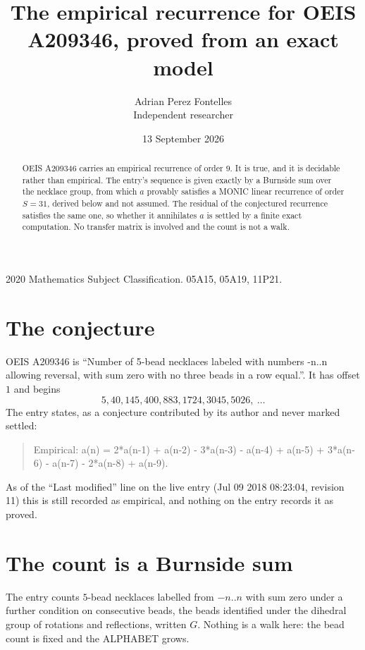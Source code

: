 \documentclass[11pt,a4paper]{article}
\title{The empirical recurrence for OEIS A209346, proved from an exact model}
\author{Adrian Perez Fontelles\\ \small Independent researcher}
\date{13 September 2026}
\theoremstyle{plain}
\theoremstyle{definition}
\begin{document}
\maketitle

\begin{abstract}
OEIS A209346 carries an empirical recurrence of order $9$. It is true, and it is
decidable rather than empirical. The entry's sequence is given exactly by a Burnside sum over the necklace group, from
which $a$ provably satisfies a MONIC linear recurrence of order $S=31$, derived below and not
assumed. The residual of the conjectured recurrence satisfies the same one, so whether it
annihilates $a$ is settled by a finite exact computation. No transfer matrix is involved and
the count is not a walk.
\end{abstract}

\noindent\small 2020 Mathematics Subject Classification. 05A15, 05A19, 11P21.\normalsize

\section{The conjecture}

OEIS A209346 is ``Number of 5-bead necklaces labeled with numbers -n..n allowing reversal, with sum zero with no three beads in a row equal.''. It has offset $1$ and begins
\[
5, 40, 145, 400, 883, 1724, 3045, 5026,\ \dots
\]
The entry states, as a conjecture contributed by its author and never marked settled:
\begin{quote}
Empirical: a(n) = 2*a(n-1) + a(n-2) - 3*a(n-3) - a(n-4) + a(n-5) + 3*a(n-6) - a(n-7) - 2*a(n-8) + a(n-9).
\end{quote}
As of the ``Last modified'' line on the live entry (Jul 09 2018 08:23:04, revision 11)
this is still recorded as empirical, and nothing on the entry records it as proved.

\section{The count is a Burnside sum}

The entry counts $5$-bead necklaces labelled from $-n..n$ with sum zero under a further
condition on consecutive beads, the beads identified under the dihedral group of rotations and reflections, written $G$. Nothing is a
walk here: the bead count is fixed and the ALPHABET grows.
\end{document}
